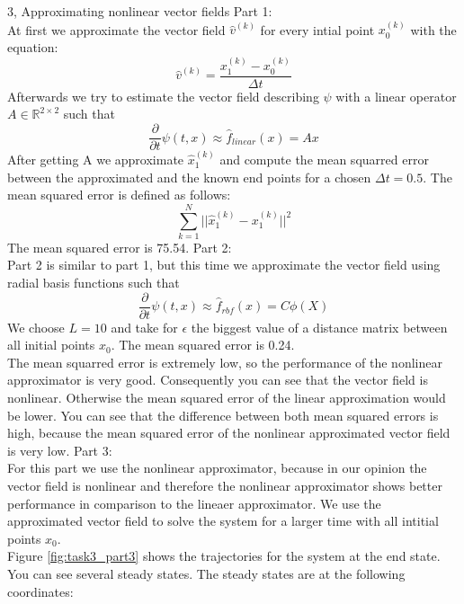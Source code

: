 \documentclass[10pt,a4paper]{article}
\begin{document}
\begin{task}{3, Approximating nonlinear vector fields}
Part 1: \\
At first we approximate the vector field $\hat{v}^{(k)}$ for every intial point $x_0^{(k)}$ with the equation:
\begin{equation*}
\hat{v}^{(k)} = \frac{x_1^{(k)} -x_0^{(k)}}{\Delta t}
\end{equation*}
Afterwards we try to estimate the vector field describing $\psi$ with a linear operator $A \in \mathbb{R}^{2\times2}$ such that
\begin{equation*}
\frac{\partial}{\partial t} \psi(t,x) \approx \hat{f}_{linear}(x) = Ax
\end{equation*}
After getting A we approximate $\hat{x}_1^{(k)}$ and compute the mean squarred error between the approximated and the known end points for a chosen $\Delta t = 0.5$.
The mean squared  error is defined as follows:
\begin{equation*}
\sum_{k=1}^N ||\hat{x}_1^{(k)} - x_{1}^{(k)}||^2
\end{equation*}
The mean squared error is 75.54.\bigbreak
Part 2: \\
Part 2 is similar to part 1, but this time we approximate the vector field using radial basis functions such that
\begin{equation*}
\frac{\partial}{\partial t}\psi(t,x) \approx \hat{f}_{rbf}(x) = C \phi(X)
\end{equation*}
 We choose $L=10$ and take  for $\epsilon$ the biggest value of a distance matrix between all initial points $x_0$.
The mean squared error is 0.24. \\
The mean squarred error is extremely low, so the performance of the nonlinear approximator is very good. Consequently you can see that the vector field is nonlinear. Otherwise the mean squared error of the linear approximation would be lower.
You can see that the difference between both mean squared errors is high, because the mean squared error of the nonlinear approximated vector field is very low. \bigbreak
Part 3: \\
For this part we use the nonlinear approximator, because in our opinion the vector field is nonlinear and therefore the nonlinear approximator shows better performance in comparison to the lineaer approximator. We use the approximated vector field to solve  the system for a larger time with all intitial points $x_0$.\\
Figure \ref{fig:task3_part3} shows the trajectories for the system at the end state. You can see several steady states. The steady states are at the following coordinates: \bigbreak

\end{task}
\end{document}
